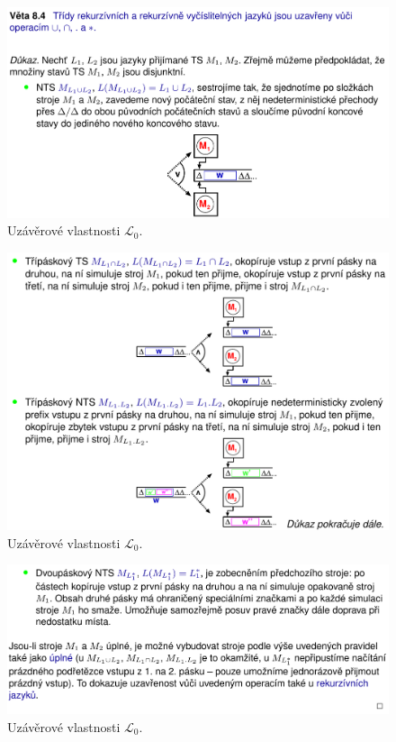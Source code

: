 \begin{figure}[H]
    \centering
    \includegraphics[width=1\linewidth]{uzaverove_vlasnosti_L0_01.pdf}
    \caption{Uzávěrové vlastnosti $\mathcal{L}_0$.}
\end{figure}

\begin{figure}[H]
    \centering
    \includegraphics[width=1\linewidth]{uzaverove_vlasnosti_L0_02.pdf}
    \caption{Uzávěrové vlastnosti $\mathcal{L}_0$.}
\end{figure}

\begin{figure}[H]
    \centering
    \includegraphics[width=1\linewidth]{uzaverove_vlasnosti_L0_03.pdf}
    \caption{Uzávěrové vlastnosti $\mathcal{L}_0$.}
\end{figure}

